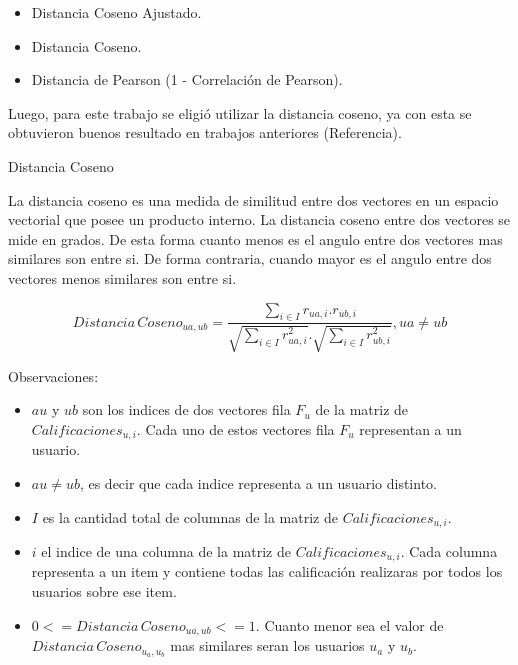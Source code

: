 \documentclass[11pt,a4paper,twoside]{thesis}
\begin{document}
\begin{itemize}
	\item Distancia Coseno Ajustado.
	\item Distancia Coseno.
	\item Distancia de Pearson (1 - Correlación de Pearson).
\end{itemize}

Luego, para este trabajo se eligió utilizar la distancia coseno, ya con esta se obtuvieron buenos resultado en trabajos anteriores (Referencia).

\begin{description}
	\item[Distancia Coseno]
\end{description}

La distancia coseno es una medida de similitud entre dos vectores en un espacio vectorial que posee un producto interno. La distancia coseno entre dos vectores se mide en grados. 
De esta forma cuanto menos es el angulo entre dos vectores mas similares son entre si. De forma contraria, cuando mayor es el angulo entre dos vectores menos similares son entre si.

\begin{equation*}
	Distancia \mspace{3mu}Coseno_{ua, ub} = \frac{ \sum_{i \in I} r_{ua, i}.r_{ub, i}}{\sqrt{\sum_{i \in I} r_{ua, i}^2}.\sqrt{\sum_{i \in I} r_{ub, i}^2}  }, ua \neq ub
\end{equation*}

\begin{description}
	\item[Observaciones:]
\end{description}
\begin{itemize}
	\item $au$ y $ub$ son los indices de dos vectores fila $F_u$ de la matriz de $Calificaciones_{u,i}$. Cada uno de estos vectores fila $F_u$ representan a un usuario.
 	\item $au \neq ub$, es decir que cada indice representa a un usuario distinto.
	\item $I$ es la cantidad total de columnas de la matriz de $Calificaciones_{u,i}$.
	\item $i$ el indice de una columna de la matriz de $Calificaciones_{u,i}$. Cada columna representa a un item y contiene todas las calificación realizaras por todos los usuarios sobre ese item.
	\item $0 <= Distancia \mspace{3mu} Coseno_{ua, ub} <= 1$. Cuanto menor sea el valor de $Distancia \mspace{3mu} Coseno_{u_a, u_b}$ mas similares seran los usuarios $u_a$ y $u_b$.
\end{itemize}
\end{document}
